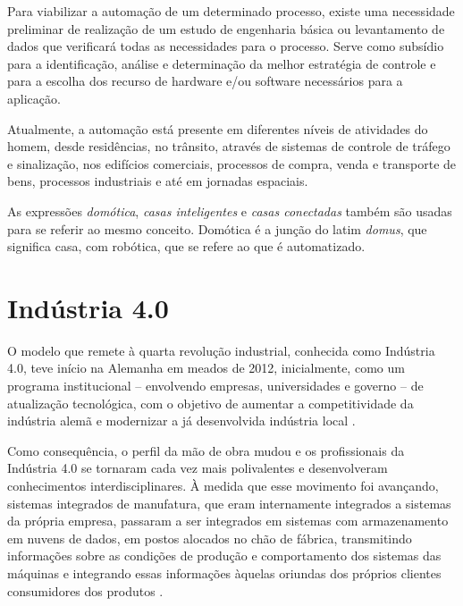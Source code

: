 \documentclass[
12pt,
openany, %
oneside, %
a4paper,			
english,			
brazil			        %
]{abntbibufjf}
\begin{document}
    Para viabilizar a automação de um determinado processo, existe uma necessidade preliminar de realização de um estudo de engenharia básica ou levantamento de dados que verificará todas as necessidades para o processo. Serve como subsídio para a identificação, análise e determinação da melhor estratégia de controle e para a escolha dos recurso de hardware e/ou software necessários para a aplicação.

    Atualmente, a automação está presente em diferentes níveis de atividades do homem, desde residências, no trânsito, através de sistemas de controle de tráfego e sinalização, nos edifícios comerciais, processos de compra, venda e transporte de bens, processos industriais e até em jornadas espaciais.
    
    As expressões \textit{domótica}, \textit{casas inteligentes} e \textit{casas conectadas} também são usadas para se referir ao mesmo conceito. Domótica é a junção do latim \textit{domus}, que significa casa, com robótica, que se refere ao que é automatizado.
	
	\section{Indústria 4.0}

	O modelo que remete à quarta revolução industrial, conhecida como Indústria 4.0, teve início na Alemanha em meados de 2012, inicialmente, como um programa institucional – envolvendo empresas, universidades e governo – de atualização tecnológica, com o objetivo de aumentar a competitividade da indústria alemã e modernizar a já desenvolvida indústria local \cite{ALMEIDA}.
	
	Como consequência, o perfil da mão de obra mudou e os profissionais da Indústria 4.0 se tornaram cada vez mais polivalentes e desenvolveram conhecimentos interdisciplinares. À medida que esse movimento foi avançando, sistemas integrados de manufatura, que eram internamente integrados a sistemas da própria empresa, passaram a ser integrados em sistemas com armazenamento em nuvens de dados, em postos alocados no chão de fábrica, transmitindo informações sobre as condições de produção e comportamento dos sistemas das máquinas e integrando essas informações àquelas oriundas dos próprios clientes consumidores dos produtos \cite{ALMEIDA}.
	
\end{document}
